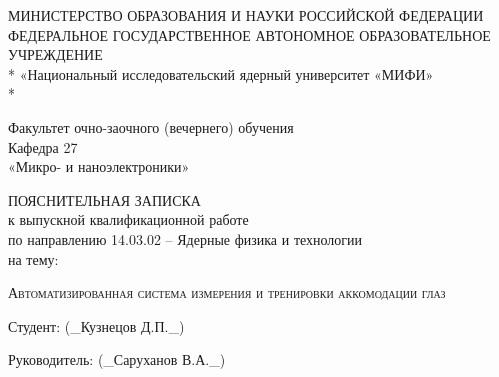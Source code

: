 \begin{titlepage}
\newpage

\begin{center}
МИНИСТЕРСТВО ОБРАЗОВАНИЯ И НАУКИ РОССИЙСКОЙ ФЕДЕРАЦИИ 
ФЕДЕРАЛЬНОЕ ГОСУДАРСТВЕННОЕ АВТОНОМНОЕ ОБРАЗОВАТЕЛЬНОЕ 
УЧРЕЖДЕНИЕ \\*
\vspace{1em}
«Национальный исследовательский ядерный университет «МИФИ»\\*
\hrulefill
\end{center}

\vspace{0.5em}

\begin{center}
 
Факультет очно-заочного (вечернего) обучения\\
Кафедра 27\\
«Микро- и наноэлектроники»\\
\end{center}

\vspace{0.5em}

\begin{center}
ПОЯСНИТЕЛЬНАЯ ЗАПИСКА\\
к выпускной квалификационной работе\\
по направлению 14.03.02 – Ядерные физика и технологии\\
на тему:
\end{center}

\vspace{0.5em}

 
\begin{center}
\textsc{Автоматизированная система измерения и тренировки аккомодации глаз}
\end{center}

\vspace{1em}
 
\begin{center}

Студент:\hspace{3.45cm} \underline{\hspace{6cm}} \hspace{\fill}(\_Кузнецов Д.П.\_)\\ 
\vspace{1em}
 
Руководитель:\hspace{2.2cm} \underline{\hspace{6cm}} \hspace{\fill}(\_Саруханов В.А.\_)\\  
\vspace{1em}
 

\end{center}
\end{titlepage}
